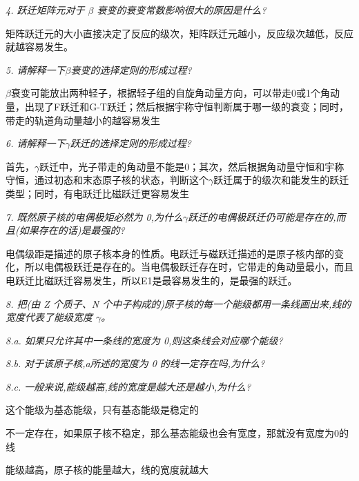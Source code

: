 \documentclass{article}
\begin{document}
\emph{}

\emph{4. 跃迁矩阵元对于 $\beta$ 衰变的衰变常数影响很大的原因是什么?}

矩阵跃迁元的大小直接决定了反应的级次，矩阵跃迁元越小，反应级次越低，反应就越容易发生。

\emph{}

\emph{5. 请解释一下$\beta$衰变的选择定则的形成过程?}

$\beta$衰变可能放出两种轻子，根据轻子组的自旋角动量方向，可以带走0或1个角动量，出现了F跃迁和G-T跃迁；然后根据宇称守恒判断属于哪一级的衰变；同时，带走的轨道角动量越小的越容易发生

\emph{}

\emph{6. 请解释一下$\gamma$跃迁的选择定则的形成过程?}

首先，$\gamma$跃迁中，光子带走的角动量不能是0；其次，然后根据角动量守恒和宇称守恒，通过初态和末态原子核的状态，判断这个$\gamma$跃迁属于的级次和能发生的跃迁类型；同时，有电跃迁比磁跃迁更容易发生

\emph{}

\emph{7. 既然原子核的电偶极矩必然为 0,为什么$\gamma$跃迁的电偶极跃迁仍可能是存在的,而且(如果存在的话)是最强的?}

电偶级距是描述的原子核本身的性质。电跃迁与磁跃迁描述的是原子核内部的变化，所以电偶极跃迁是存在的。当电偶极跃迁存在时，它带走的角动量最小，而且电跃迁比磁跃迁容易发生，所以E1是最容易发生的，是最强的跃迁。

\emph{}

\emph{8. 把(由 Z 个质子、N 个中子构成的)原子核的每一个能级都用一条线画出来,线的宽度代表了能级宽度 $\gamma$。}

\emph{ 8.a. 如果只允许其中一条线的宽度为 0,则这条线会对应哪个能级?}

\emph{ 8.b. 对于该原子核,a所述的宽度为 0 的线一定存在吗,为什么?}

\emph{ 8.c. 一般来说,能级越高,线的宽度是越大还是越小,为什么?}

这个能级为基态能级，只有基态能级是稳定的

不一定存在，如果原子核不稳定，那么基态能级也会有宽度，那就没有宽度为0的线

能级越高，原子核的能量越大，线的宽度就越大
\end{document}
